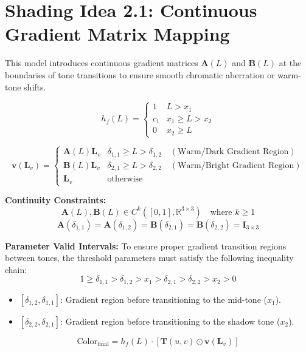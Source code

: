 \documentclass{article}
\begin{document}
\vspace{1cm}

\section*{Shading Idea 2.1: Continuous Gradient Matrix Mapping}

This model introduces continuous gradient matrices $\mathbf{A}(L)$ and $\mathbf{B}(L)$ at the boundaries of tone transitions to ensure smooth chromatic aberration or warm-tone shifts.

\[
h_f(L) = 
\begin{cases} 
1 & L > x_1 \\
c_1 & x_1 \ge L > x_2 \\
0 & x_2 \ge L 
\end{cases}
\]

\[
\mathbf{v}(\mathbf{L}_v) = 
\begin{cases} 
\mathbf{A}(L) \mathbf{L}_v & \delta_{1,1} \ge L > \delta_{1,2} \quad (\text{Warm/Dark Gradient Region}) \\
\mathbf{B}(L) \mathbf{L}_v & \delta_{2,1} \ge L > \delta_{2,2} \quad (\text{Warm/Bright Gradient Region}) \\
\mathbf{L}_v & \text{otherwise}
\end{cases}
\]

\noindent \textbf{Continuity Constraints:}
\[
\mathbf{A}(L), \mathbf{B}(L) \in C^k([0,1], \mathbb{R}^{3 \times 3}) \quad \text{where } k \ge 1
\]
\[
\mathbf{A}(\delta_{1,1}) = \mathbf{A}(\delta_{1,2}) = \mathbf{B}(\delta_{2,1}) = \mathbf{B}(\delta_{2,2}) = \mathbf{I}_{3 \times 3}
\]

\noindent \textbf{Parameter Valid Intervals:}
To ensure proper gradient transition regions between tones, the threshold parameters must satisfy the following inequality chain:
\[
1 \ge \delta_{1,1} > \delta_{1,2} > x_1 > \delta_{2,1} > \delta_{2,2} > x_2 > 0
\]
\begin{itemize}
    \item $[\delta_{1,2}, \delta_{1,1}]$: Gradient region before transitioning to the mid-tone ($x_1$).
    \item $[\delta_{2,2}, \delta_{2,1}]$: Gradient region before transitioning to the shadow tone ($x_2$).
\end{itemize}

\[
\text{Color}_{\text{final}} = h_f(L) \cdot [ \mathbf{T}(u,v) \odot \mathbf{v}(\mathbf{L}_v) ]
\]
\end{document}
